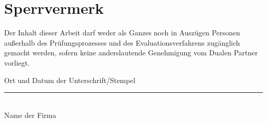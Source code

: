 
\thispagestyle{empty}

\section*{Sperrvermerk}
\vspace*{2em}


Der Inhalt dieser Arbeit darf weder als Ganzes noch in Auszügen Personen außerhalb des Prüfungsprozesses und des 
Evaluationsverfahrens zugänglich gemacht werden, sofern keine anderslautende Genehmigung vom Dualen Partner vorliegt.

\vspace{3em}

{\color{red}Ort und Datum der Unterschrift/Stempel}
\vspace{4em}

\rule{7cm}{0.4pt}\\
Name der Firma
